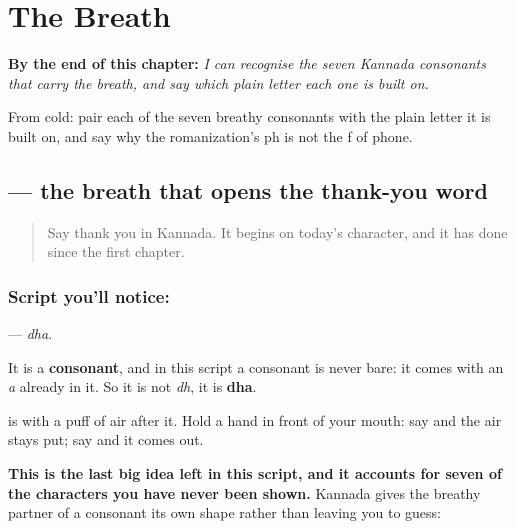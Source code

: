 
\chapter{The Breath}
\label{ch:ka-usiru}

\begin{chapteropening}
\textbf{By the end of this chapter:} \emph{I can recognise the seven Kannada consonants that carry the breath, and say which plain letter each one is built on.}

From cold: pair each of the seven breathy consonants with the plain letter it is built on, and say why the romanization's ph is not the f of phone.
\end{chapteropening}

\section[\texorpdfstring{\kn{ಧ} (dha)}{ಧ (dha)}]{ — the breath that opens the thank-you word}

\label{lesson:KA-S167-letter-dha}



\begin{quote}
Say thank you in Kannada. It begins on today's character, and it has done since the first chapter.
\end{quote}

\subsection*{Script you'll notice: }
\textbf{} — \emph{dha}.

It is a \textbf{consonant}, and in this script a consonant is never bare: it comes with an \emph{a} already in it. So it is not \emph{dh}, it is \textbf{dha}.

\textbf{} is \textbf{} with a puff of air after it. Hold a hand in front of your mouth: say  and the air stays put; say  and it comes out.

\textbf{This is the last big idea left in this script, and it accounts for seven of the characters you have never been shown.} Kannada gives the breathy partner of a consonant its own shape rather than leaving you to guess:

